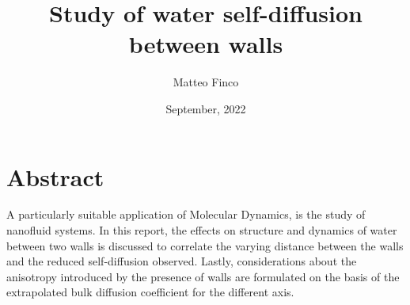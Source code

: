 \documentclass[
	12pt, %
]{fphw}
\title{Study of water self-diffusion between walls} %
\author{Matteo Finco} %
\date{September, 2022} %
\institute{Università degli studi di Padova, Dipartimento di Scienze Chimiche} %
\begin{document}
 
\maketitle %


\section*{Abstract}
A particularly suitable application of Molecular Dynamics, is the study of nanofluid systems. In this report, the effects on structure and dynamics of water between two walls is discussed to correlate the varying distance between the walls and the reduced self-diffusion observed.
Lastly, considerations about the anisotropy introduced by the presence of walls are formulated on the basis of the extrapolated bulk diffusion coefficient for the different axis.

\end{document}
